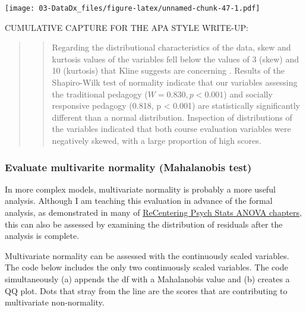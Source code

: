 \documentclass[
  11pt,
]{book}
\newenvironment{Shaded}{\begin{snugshade}}{\end{snugshade}}
\newcommand{\FunctionTok}[1]{\textcolor[rgb]{0.27,0.27,0.27}{\textbf{#1}}}
\newcommand{\NormalTok}[1]{#1}
\newcommand{\OtherTok}[1]{\textcolor[rgb]{0.37,0.37,0.37}{#1}}
\newcommand{\SpecialCharTok}[1]{\textcolor[rgb]{0.43,0.43,0.43}{\textbf{#1}}}
\newcommand{\StringTok}[1]{\textcolor[rgb]{0.5,0.5,0.5}{#1}}
\begin{document}
\texttt{[image: 03-DataDx\_files/figure-latex/unnamed-chunk-47-1.pdf]}

CUMULATIVE CAPTURE FOR THE APA STYLE WRITE-UP:

\begin{quote}
\begin{quote}
Regarding the distributional characteristics of the data, skew and kurtosis values of the variables fell below the values of 3 (skew) and 10 (kurtosis) that Kline suggests are concerning \citeyearpar{kline_principles_2016}. Results of the Shapiro-Wilk test of normality indicate that our variables assessing the traditional pedagogy (\(W = 0.830, p < 0.001\)) and socially responsive pedagogy (0.818, p \textless{} 0.001) are statistically significantly different than a normal distribution. Inspection of distributions of the variables indicated that both course evaluation variables were negatively skewed, with a large proportion of high scores.
\end{quote}
\end{quote}

\hypertarget{evaluate-multivarite-normality-mahalanobis-test}{%
\subsubsection*{Evaluate multivarite normality (Mahalanobis test)}\label{evaluate-multivarite-normality-mahalanobis-test}}


In more complex models, multivariate normality is probably a more useful analysis. Although I am teaching this evaluation in advance of the formal analysis, as demonstrated in many of \href{https://lhbikos.github.io/ReCenterPsychStats/analysis-of-variance.html}{ReCentering Psych Stats ANOVA chapters}, this can also be assessed by examining the distribution of residuals after the analysis is complete.

Multivariate normality can be assessed with the continuously scaled variables. The code below includes the only two continuously scaled variables. The code simultaneously (a) appends the df with a Mahalanobis value and (b) creates a QQ plot. Dots that stray from the line are the scores that are contributing to multivariate non-normality.

\begin{Shaded}
\end{Shaded}
\end{document}
